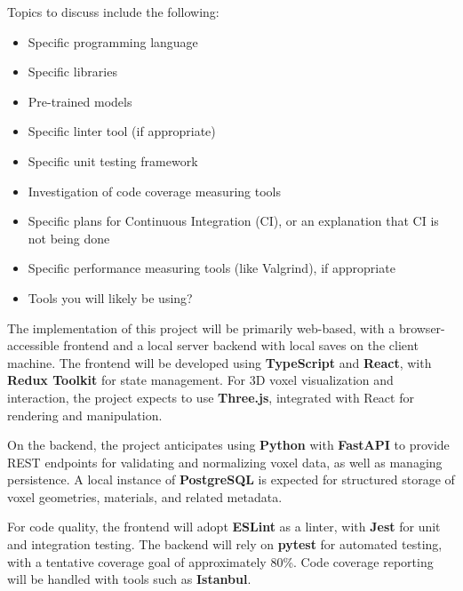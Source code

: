 \documentclass{article}
\begin{document}

Topics to discuss include the following:

\begin{itemize}
\item Specific programming language
\item Specific libraries
\item Pre-trained models
\item Specific linter tool (if appropriate)
\item Specific unit testing framework
\item Investigation of code coverage measuring tools
\item Specific plans for Continuous Integration (CI), or an explanation that CI
  is not being done
\item Specific performance measuring tools (like Valgrind), if
  appropriate
\item Tools you will likely be using?
\end{itemize}

\fi

The implementation of this project will be primarily web-based, with a
browser-accessible frontend and a local server backend with local saves on the client machine. The frontend will be
developed using \textbf{TypeScript} and \textbf{React}, with
\textbf{Redux Toolkit} for state management. For 3D voxel visualization and
interaction, the project expects to use \textbf{Three.js}, integrated with
React for rendering and manipulation.

On the backend, the project anticipates using \textbf{Python} with
\textbf{FastAPI} to provide REST endpoints for validating and normalizing voxel
data, as well as managing persistence. A local instance of
\textbf{PostgreSQL} is expected for structured storage of voxel geometries,
materials, and related metadata.

For code quality, the frontend will adopt \textbf{ESLint} as a linter, with
\textbf{Jest} for unit and integration testing. The backend will rely on
\textbf{pytest} for automated testing, with a tentative coverage goal of
approximately 80\%. Code coverage reporting will be handled with tools such as
\textbf{Istanbul}.
\end{document}
